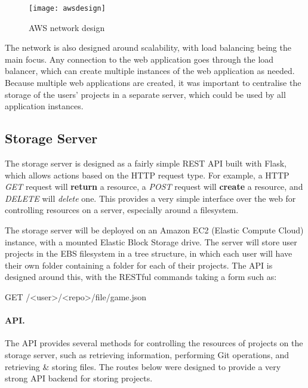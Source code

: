 	\begin{figure}[h]
		\centering
		\texttt{[image: awsdesign]}
		\caption{AWS network design}
		\label{fig:awsnetworkdesign}
	\end{figure}

	The network is also designed around scalability, with load balancing being the main focus. Any connection to the web application goes through the load balancer, which can create multiple instances of the web application as needed. Because multiple web applications are created, it was important to centralise the storage of the users' projects in a separate server, which could be used by all application instances.

	\subsection{Storage Server}
	\label{subsection:storageserverdesign}
	The storage server is designed as a fairly simple REST API built with Flask, which allows actions based on the HTTP request type. For example, a HTTP \emph{GET} request will \textbf{return} a resource, a \emph{POST} request will \textbf{create} a resource, and \emph{DELETE} will \emph{delete} one. This provides a very simple interface over the web for controlling resources on a server, especially around a filesystem.

	The storage server will be deployed on an Amazon EC2 (Elastic Compute Cloud) instance, with a mounted Elastic Block Storage drive. The server will store user projects in the EBS filesystem in a tree structure, in which each user will have their own folder containing a folder for each of their projects. The API is designed around this, with the RESTful commands taking a form such as:

	GET /<user>/<repo>/file/game.json

	\paragraph{API.}
	The API provides several methods for controlling the resources of projects on the storage server, such as retrieving information, performing Git operations, and retrieving \& storing files. The routes below were designed to provide a very strong API backend for storing projects.

